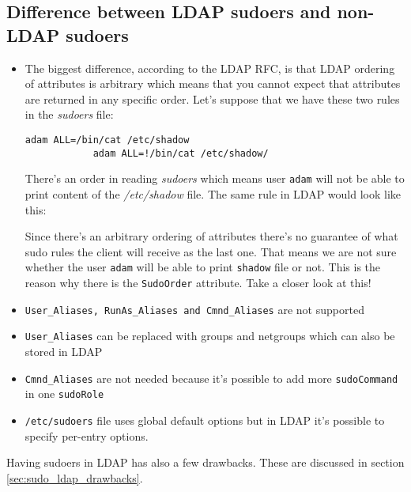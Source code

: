 \documentclass[12pt,a4paper,titlepage,final]{article}
\begin{document}
\subsection{Difference between LDAP sudoers and non-LDAP sudoers}
\begin{itemize} 
	\item The biggest difference, according to the LDAP RFC, is that LDAP ordering
		of attributes is arbitrary which means that you cannot expect that
		attributes are returned in any specific order. 
		Let's suppose that we have these two rules in the \emph{sudoers} file:

		\begin{lstlisting}[basicstyle=\ttfamily\small,frame=lines,showtabs=false]
			adam ALL=/bin/cat /etc/shadow
			adam ALL=!/bin/cat /etc/shadow/
		\end{lstlisting}

		There's an order in reading \emph{sudoers} which means user \texttt{adam} will not be
		able to print content of the \emph{/etc/shadow} file. The same rule in LDAP
		would look like this:

		
		Since there's an arbitrary ordering of attributes there's no guarantee of what
		sudo rules the client will receive as the last one. That means we are not 
		sure whether the user \texttt{adam} will be able to print \texttt{shadow}
		file or not. This is the reason why there is the \texttt{SudoOrder}
		attribute. {\color{blue}Take a closer look at this!}

	\item \texttt{User\_Aliases, RunAs\_Aliases and Cmnd\_Aliases} are not supported
	\item \texttt{User\_Aliases} can be replaced with groups and netgroups which can
		also be stored in LDAP
	\item \texttt{Cmnd\_Aliases} are not needed because it's possible to add more
		\texttt{sudoCommand} in one \texttt{sudoRole}
	\item \texttt{/etc/sudoers} file uses global default options but in LDAP it's
		possible to specify per-entry options.
\end{itemize}

Having sudoers in LDAP has also a few drawbacks. These are discussed in section
\ref{sec:sudo_ldap_drawbacks}.
\end{document}

